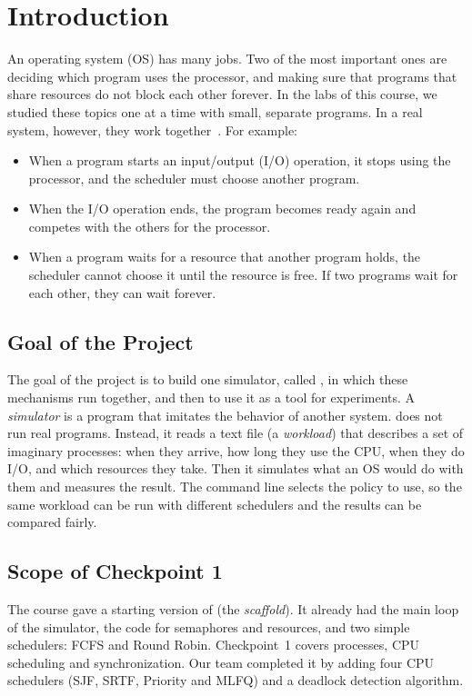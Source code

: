 \section{Introduction}
An operating system (OS) has many jobs. Two of the most important ones are deciding which program uses the processor, and making sure that programs that share resources do not block each other forever. In the labs of this course, we studied these topics one at a time with small, separate programs. In a real system, however, they work together~\cite{brief}. For example:
\begin{itemize}
    \item When a program starts an input/output (I/O) operation, it stops using the processor, and the scheduler must choose another program.
    \item When the I/O operation ends, the program becomes ready again and competes with the others for the processor.
    \item When a program waits for a resource that another program holds, the scheduler cannot choose it until the resource is free. If two programs wait for each other, they can wait forever.
\end{itemize}

\subsection{Goal of the Project}
The goal of the project is to build one simulator, called \ossim, in which these mechanisms run together, and then to use it as a tool for experiments. A \emph{simulator} is a program that imitates the behavior of another system. \ossim{} does not run real programs. Instead, it reads a text file (a \emph{workload}) that describes a set of imaginary processes: when they arrive, how long they use the CPU, when they do I/O, and which resources they take. Then it simulates what an OS would do with them and measures the result. The command line selects the policy to use, so the same workload can be run with different schedulers and the results can be compared fairly.

\subsection{Scope of Checkpoint 1}
The course gave a starting version of \ossim{} (the \emph{scaffold}). It already had the main loop of the simulator, the code for semaphores and resources, and two simple schedulers: FCFS and Round Robin. Checkpoint~1 covers processes, CPU scheduling and synchronization. Our team completed it by adding four CPU schedulers (SJF, SRTF, Priority and MLFQ) and a deadlock detection algorithm.

